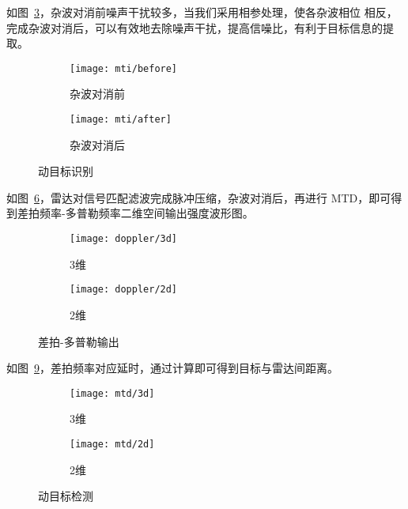 \documentclass[../main]{subfiles}
\begin{document}
如图~\ref{fig:mti}，杂波对消前噪声干扰较多，当我们采用相参处理，使各杂波相位
相反，完成杂波对消后，可以有效地去除噪声干扰，提高信噪比，有利于目标信息的提
取。

\begin{figure}[htbp]
  \centering
  \begin{subfigure}[htbp]{0.45\linewidth}
    \centering
    \texttt{[image: mti/before]}
    \caption{杂波对消前}%
    \label{fig:mti/before}
  \end{subfigure}
  \quad
  \begin{subfigure}[htbp]{0.45\linewidth}
    \centering
    \texttt{[image: mti/after]}
    \caption{杂波对消后}%
    \label{fig:mti/after}
  \end{subfigure}
  \caption{动目标识别}%
  \label{fig:mti}
\end{figure}

如图~\ref{fig:doppler}，雷达对信号匹配滤波完成脉冲压缩，杂波对消后，再进行
MTD，即可得到差拍频率-多普勒频率二维空间输出强度波形图。

\begin{figure}[htbp]
  \centering
  \begin{subfigure}[htbp]{0.45\linewidth}
    \centering
    \texttt{[image: doppler/3d]}
    \caption{3维}%
    \label{fig:doppler/3d}
  \end{subfigure}
  \quad
  \begin{subfigure}[htbp]{0.45\linewidth}
    \centering
    \texttt{[image: doppler/2d]}
    \caption{2维}%
    \label{fig:doppler/2d}
  \end{subfigure}
  \caption{差拍-多普勒输出}%
  \label{fig:doppler}
\end{figure}

如图~\ref{fig:mtd}，差拍频率对应延时，通过计算即可得到目标与雷达间距离。

\begin{figure}[htbp]
  \centering
  \begin{subfigure}[htbp]{0.45\linewidth}
    \centering
    \texttt{[image: mtd/3d]}
    \caption{3维}%
    \label{fig:mtd/3d}
  \end{subfigure}
  \quad
  \begin{subfigure}[htbp]{0.45\linewidth}
    \centering
    \texttt{[image: mtd/2d]}
    \caption{2维}%
    \label{fig:mtd/2d}
  \end{subfigure}
  \caption{动目标检测}%
  \label{fig:mtd}
\end{figure}
\end{document}
